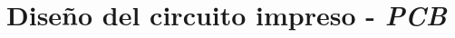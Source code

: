 \documentclass[10pt,a4paper]{article}
\begin{document}
%			
%		
%			
%		
%			
%	
%			
%	
%			
%	
%			
%		
%			
%	
%			
%			
%			
	\part{Diseño del circuito impreso - \emph{PCB}}\label{part:pcb}
\end{document}
